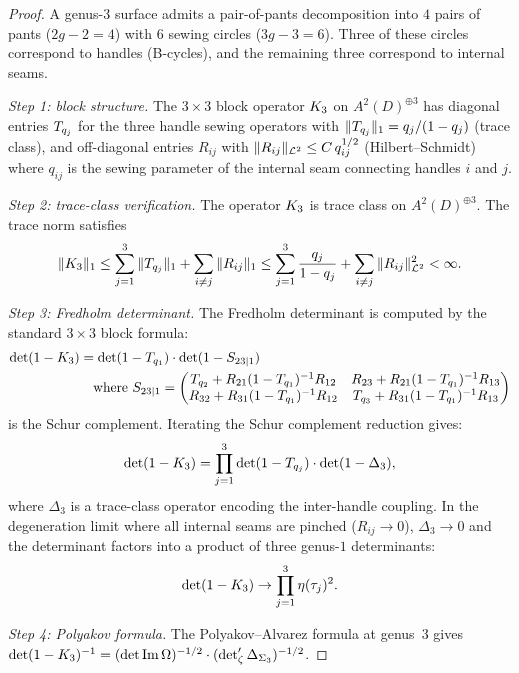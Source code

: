 \begin{proof}
A genus-$3$ surface admits a pair-of-pants decomposition into
$4$ pairs of pants ($2g - 2 = 4$) with $6$ sewing circles
($3g - 3 = 6$). Three of these circles correspond to handles
(B-cycles), and the remaining three correspond to internal
seams.

\emph{Step 1: block structure.}
The $3 \times 3$ block operator $K_3$ on
$A^2(D)^{\oplus 3}$ has diagonal entries $T_{q_j}$
for the three handle sewing operators with
$\|T_{q_j}\|_1 = q_j/(1-q_j)$ (trace class), and
off-diagonal entries $R_{ij}$ with
$\|R_{ij}\|_{\mathcal{L}^2} \leq C\,q_{ij}^{1/2}$
(Hilbert--Schmidt) where $q_{ij}$ is the sewing parameter
of the internal seam connecting handles $i$ and $j$.

\emph{Step 2: trace-class verification.}
The operator $K_3$ is trace class on $A^2(D)^{\oplus 3}$.
The trace norm satisfies
\[
\|K_3\|_1
\leq \sum_{j=1}^{3} \|T_{q_j}\|_1
+ \sum_{i \neq j} \|R_{ij}\|_1
\leq \sum_{j=1}^{3} \frac{q_j}{1-q_j}
+ \sum_{i \neq j}
\|R_{ij}\|_{\mathcal{L}^2}^2
< \infty.
\]

\emph{Step 3: Fredholm determinant.}
The Fredholm determinant is computed by the standard $3 \times 3$
block formula:
\begin{align}
\det(1 - K_3)
&= \det(1 - T_{q_1})
\cdot \det(1 - S_{23|1})
\notag\\
&\quad\text{where } S_{23|1}
= \begin{pmatrix} T_{q_2} + R_{21}(1-T_{q_1})^{-1}R_{12}
& R_{23} + R_{21}(1-T_{q_1})^{-1}R_{13}\\
R_{32} + R_{31}(1-T_{q_1})^{-1}R_{12}
& T_{q_3} + R_{31}(1-T_{q_1})^{-1}R_{13}
\end{pmatrix}
\notag
\end{align}
is the Schur complement. Iterating the Schur complement
reduction gives:
\begin{equation}%
\det(1 - \sewker_3)
= \prod_{j=1}^{3} \det(1 - \sewop_{q_j})
\cdot \det(1 - \Delta_3),
\end{equation}
where $\Delta_3$ is a trace-class operator encoding the
inter-handle coupling. In the degeneration limit where all
internal seams are pinched ($R_{ij} \to 0$), $\Delta_3 \to 0$
and the determinant factors into a product of three genus-$1$
determinants:
\[
\det(1 - K_3)
\to
\prod_{j=1}^{3}
\eta(\tau_j)^2.
\]

\emph{Step 4: Polyakov formula.}
The Polyakov--Alvarez formula at genus~$3$ gives
$\det(1-K_3)^{-1}
= (\det\operatorname{Im}\Omega)^{-1/2}
\cdot (\det\nolimits'_\zeta\Delta_{\Sigma_3})^{-1/2}$.
\end{proof}

